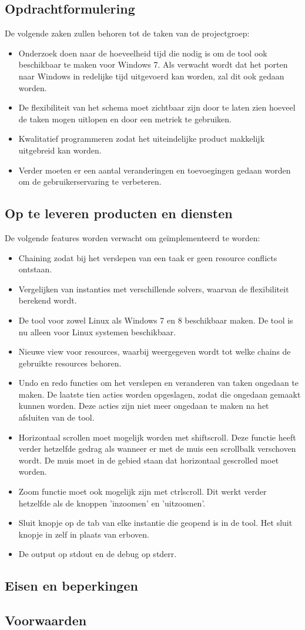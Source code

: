 \subsection{Opdrachtformulering}
De volgende zaken zullen behoren tot de taken van de projectgroep:
\begin{itemize}
	\item Onderzoek doen naar de hoeveelheid tijd die nodig is om de tool ook beschikbaar te maken voor Windows 7. Als verwacht wordt dat het porten naar Windows in redelijke tijd uitgevoerd kan worden, zal dit ook gedaan worden. 
	\item De flexibiliteit van het schema moet zichtbaar zijn door te laten zien hoeveel de taken mogen uitlopen en door een metriek te gebruiken.
	\item Kwalitatief programmeren zodat het uiteindelijke product makkelijk uitgebreid kan worden.
	\item Verder moeten er een aantal veranderingen en toevoegingen gedaan worden om de gebruikerservaring te verbeteren. 
\end{itemize}

\subsection{Op te leveren producten en diensten}
De volgende features worden verwacht om ge\"implementeerd te worden:
\begin{itemize}
	\item Chaining zodat bij het verslepen van een taak er geen resource conflicts ontstaan.
	\item Vergelijken van instanties met verschillende solvers, waarvan de flexibiliteit berekend wordt.
	\item De tool voor zowel Linux als Windows 7 en 8 beschikbaar maken. De tool is nu alleen voor Linux systemen beschikbaar. 
	\item Nieuwe view voor resources, waarbij weergegeven wordt tot welke chains de gebruikte resources behoren.
	\item Undo en redo functies om het verslepen en veranderen van taken ongedaan te maken. De laatste tien acties worden opgeslagen, zodat die ongedaan gemaakt kunnen worden. Deze acties zijn niet meer ongedaan te maken na het afsluiten van de tool. 
	\item Horizontaal scrollen moet mogelijk worden met shift\plus scroll. Deze functie heeft verder hetzelfde gedrag als wanneer er met de muis een scrollbalk verschoven wordt. De muis moet in de gebied staan dat horizontaal gescrolled moet worden. 
	\item Zoom functie moet ook mogelijk zijn met ctrl\plus scroll. Dit werkt verder hetzelfde als de knoppen 'inzoomen' en 'uitzoomen'.
	\item Sluit knopje op de tab van elke instantie die geopend is in de tool. Het sluit knopje in  zelf in plaats van erboven.
	\item De output op stdout en de debug op stderr.
\end{itemize}

\subsection{Eisen en beperkingen}
\subsection{Voorwaarden}
